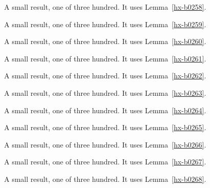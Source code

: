 \begin{lemma}[Bulk 259]\label{hx-b0259}
A small result, one of three hundred. It uses Lemma~\ref{hx-b0258}.
\end{lemma}

\begin{lemma}[Bulk 260]\label{hx-b0260}
A small result, one of three hundred. It uses Lemma~\ref{hx-b0259}.
\end{lemma}

\begin{lemma}[Bulk 261]\label{hx-b0261}
A small result, one of three hundred. It uses Lemma~\ref{hx-b0260}.
\end{lemma}

\begin{lemma}[Bulk 262]\label{hx-b0262}
A small result, one of three hundred. It uses Lemma~\ref{hx-b0261}.
\end{lemma}

\begin{lemma}[Bulk 263]\label{hx-b0263}
A small result, one of three hundred. It uses Lemma~\ref{hx-b0262}.
\end{lemma}

\begin{lemma}[Bulk 264]\label{hx-b0264}
A small result, one of three hundred. It uses Lemma~\ref{hx-b0263}.
\end{lemma}

\begin{lemma}[Bulk 265]\label{hx-b0265}
A small result, one of three hundred. It uses Lemma~\ref{hx-b0264}.
\end{lemma}

\begin{lemma}[Bulk 266]\label{hx-b0266}
A small result, one of three hundred. It uses Lemma~\ref{hx-b0265}.
\end{lemma}

\begin{lemma}[Bulk 267]\label{hx-b0267}
A small result, one of three hundred. It uses Lemma~\ref{hx-b0266}.
\end{lemma}

\begin{lemma}[Bulk 268]\label{hx-b0268}
A small result, one of three hundred. It uses Lemma~\ref{hx-b0267}.
\end{lemma}

\begin{lemma}[Bulk 269]\label{hx-b0269}
A small result, one of three hundred. It uses Lemma~\ref{hx-b0268}.
\end{lemma}

